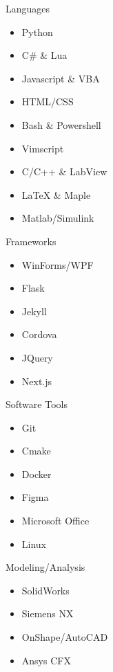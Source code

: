 \begin{minipage}{\dimexpr\textwidth-2ex}
\begin{multicols}{5}%
    {\color{cblue} Languages}
    \begin{itemize}[topsep=3pt,label=\textcolor{blue}{\textbullet},leftmargin=*]
        \itemsep-0.2em 
        \item Python
        \item C\# \& Lua
        \item Javascript \& VBA
        \item HTML/CSS
        \item Bash \& Powershell 
        \item Vimscript
        \item C/C++ \& LabView
        \item LaTeX \& Maple
        \item Matlab/Simulink
    \end{itemize}
    \columnbreak
    {\color{cblue} Frameworks}
    \begin{itemize}[topsep=3pt,label=\textcolor{blue}{\textbullet},leftmargin=*]
        \itemsep-0.2em 
        \item WinForms/WPF
        \item Flask
        \item Jekyll
        \item Cordova
        \item JQuery
        \item Next.js
    \end{itemize}
    \columnbreak
    {\color{cblue} Software Tools}
    \begin{itemize}[topsep=3pt,label=\textcolor{blue}{\textbullet},leftmargin=*]
        \itemsep-0.2em 
        \item Git
        \item Cmake
        \item Docker
        \item Figma
        \item Microsoft Office
        \item Linux
    \end{itemize}
    \columnbreak
    {\color{cblue} Modeling/Analysis}
    \begin{itemize}[topsep=3pt,label=\textcolor{blue}{\textbullet},leftmargin=*]
        \itemsep-0.2em 
        \item SolidWorks
        \item Siemens NX
        \item OnShape/AutoCAD
        \item Ansys CFX

\end{itemize}
\end{multicols}
\end{minipage}
